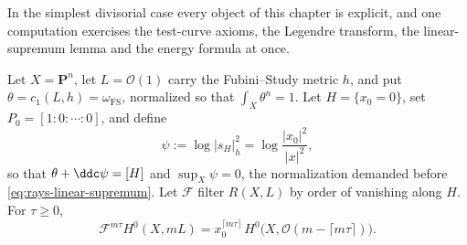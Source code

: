 \begin{example}
\label{ex:rays-hyperplane-test-curve}
In the simplest divisorial case every object of this chapter is explicit,
and one computation exercises the test-curve axioms, the Legendre
transform, the linear-supremum lemma and the energy formula at once.

Let $X=\mathbf P^n$, let $L=\mathcal O(1)$ carry the Fubini--Study
metric $h$, and put $\theta=c_1(L,h)=\omega_{\mathrm{FS}}$, normalized
so that $\int_X\theta^n=1$. Let $H=\{x_0=0\}$, set
$P_0=[1:0:\cdots:0]$, and define
\[
 \psi:=\log|s_H|_h^2=\log\frac{|x_0|^2}{|x|^2},
\]
so that $\theta+\ddc\psi=[H]$ and $\sup_X\psi=0$, the normalization
demanded before \eqref{eq:rays-linear-supremum}.  Let $\mathcal F$ filter
$R(X,L)$ by order of vanishing along $H$. For $\tau\geq0$,
\[
 \mathcal F^{m\tau}H^0(X,mL)
 =x_0^{\lceil m\tau\rceil}\,
  H^0\bigl(X,\mathcal O(m-\lceil m\tau\rceil)\bigr).
\]


\end{example}
